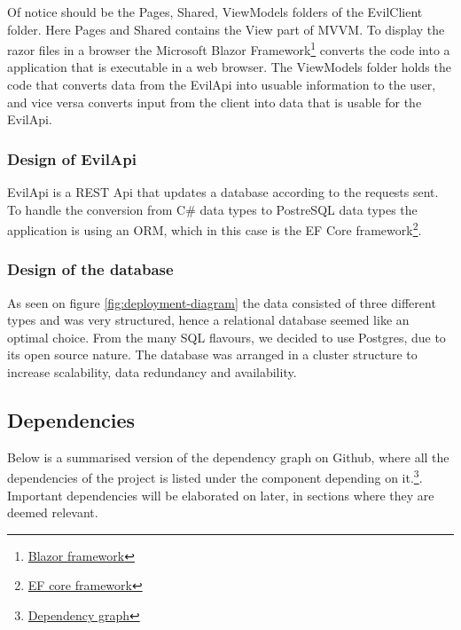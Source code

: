 \documentclass[report/main.tex]{subfiles}
\begin{document}
                Of notice should be the Pages, Shared, ViewModels folders of the EvilClient folder. Here Pages and Shared contains the View part of MVVM. To display the razor files in a browser the Microsoft Blazor Framework\footnote{\href{https://dotnet.microsoft.com/apps/aspnet/web-apps/blazor}{Blazor framework}} converts the code into a application that is executable in a web browser. The ViewModels folder holds the code that converts data from the EvilApi into usuable information to the user, and vice versa converts input from the client into data that is usable for the EvilApi.
    
            \subsubsection{Design of EvilApi}
            \label{subsubsec:architecture-of-evilApi}
                EvilApi is a REST \cite{rest} Api that updates a database according to the requests sent. To handle the conversion from C\# data types to PostreSQL data types the application is using an ORM, which in this case is the EF Core framework\footnote{\href{https://docs.microsoft.com/en-us/ef/core/}{EF core framework}}.
            
            \subsubsection{Design of the database}
            \label{subsubsec:design-of-the-database}
                As seen on figure \ref{fig:deployment-diagram} the data consisted of three different types and was very structured, hence a relational database seemed like an optimal choice. From the many SQL flavours, we decided to use Postgres, due to its open source nature. The database was arranged in a cluster structure to increase scalability, data redundancy and availability.
        
        \subsection{Dependencies}
        \label{subsec:dependencies}
            Below is a summarised version of the dependency graph on Github, where all the dependencies of the project is listed under the component depending on it.\footnote{\href{https://github.com/gustavjohansen98/E-vil-Corp/network/dependencies}{Dependency graph}}. Important dependencies will be elaborated on later, in sections where they are deemed relevant.
        
\end{document}
